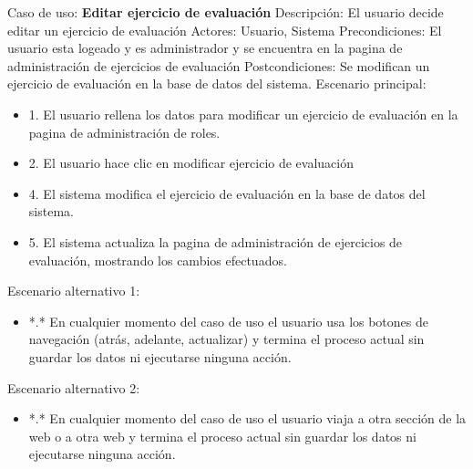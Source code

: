 Caso de uso: \textbf{Editar ejercicio de evaluación}
\newline
Descripción: El usuario decide editar un ejercicio de evaluación
\newline
Actores: Usuario, Sistema
\newline
Precondiciones: El usuario esta logeado y es administrador y se encuentra en la pagina de administración de ejercicios de evaluación
\newline
Postcondiciones: Se modifican un ejercicio de evaluación en la base de datos del sistema.
\newline
Escenario principal:
\begin{itemize}
	\item 1. El usuario rellena los datos para modificar un ejercicio de evaluación en la pagina de administración de roles.
	\item 2. El usuario hace clic en modificar ejercicio de evaluación
	\item 4. El sistema modifica el ejercicio de evaluación en la base de datos del sistema.
	\item 5. El sistema actualiza la pagina de administración de ejercicios de evaluación, mostrando los cambios efectuados.
\end{itemize}
Escenario alternativo 1: 
\begin{itemize}
	\item *.* En cualquier momento del caso de uso el usuario usa los botones de navegación (atrás, adelante, actualizar) y termina el proceso actual sin guardar los datos ni ejecutarse ninguna acción.
\end{itemize}
Escenario alternativo 2:
\begin{itemize}
	\item *.* En cualquier momento del caso de uso el usuario viaja a otra sección de la web o a otra web y termina el proceso actual sin guardar los datos ni ejecutarse ninguna acción.
\end{itemize}

